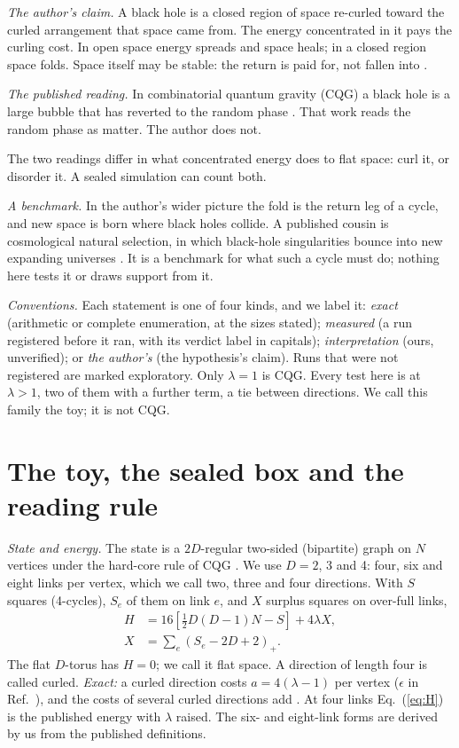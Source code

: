 \documentclass[aps,pre,10pt,twocolumn,superscriptaddress,nofootinbib]{revtex4-2}
\begin{document}
\emph{The author's claim.} A black hole is a closed region of space re-curled toward the curled arrangement that space
came from. The energy concentrated in it pays the curling cost. In open space energy spreads and space heals; in a
closed region space folds. Space itself may be stable: the return is paid for, not fallen into \cite{repo}.

\emph{The published reading.} In combinatorial quantum gravity (CQG) a black hole is a large bubble that has reverted
to the random phase \cite{T25}. That work reads the random phase as matter. The author does not.

The two readings differ in what concentrated energy does to flat space: curl it, or disorder it. A sealed simulation
can count both.

\emph{A benchmark.} In the author's wider picture the fold is the return leg of a cycle, and new space is born where
black holes collide. A published cousin is cosmological natural selection, in which black-hole singularities bounce
into new expanding universes \cite{Smolin06}. It is a benchmark for what such a cycle must do; nothing here tests it
or draws support from it.

\emph{Conventions.} Each statement is one of four kinds, and we label it: \emph{exact} (arithmetic or complete
enumeration, at the sizes stated); \emph{measured} (a run registered before it ran, with its verdict label in
capitals); \emph{interpretation} (ours, unverified); or \emph{the author's} (the hypothesis's claim). Runs that were
not registered are marked exploratory. Only $\lambda = 1$ is CQG. Every test here is at $\lambda > 1$, two of them
with a further term, a tie between directions. We call this family the toy; it is not CQG.

\section{The toy, the sealed box and the reading rule}\label{sec:toy}

\emph{State and energy.} The state is a $2D$-regular two-sided (bipartite) graph on $N$ vertices under the hard-core
rule of CQG \cite{T25}. We use $D = 2$, 3 and 4: four, six and eight links per vertex, which we call two, three and
four directions. With $S$ squares (4-cycles), $S_e$ of them on link $e$, and $X$ surplus squares on over-full links,
\begin{equation}
\begin{aligned}
  H &= 16\left[\tfrac{1}{2}D(D-1)N - S\right] + 4\lambda X ,\\
  X &= \textstyle\sum_e (S_e - 2D + 2)_+ .
\end{aligned}
\label{eq:H}
\end{equation}
The flat $D$-torus has $H = 0$; we call it flat space. A direction of length four is called curled. \emph{Exact:} a
curled direction costs $a = 4(\lambda - 1)$ per vertex ($\epsilon$ in Ref.~\cite{paper1}), and the costs of several
curled directions add \cite{paper5,repo}. At four links Eq.~(\ref{eq:H}) is the published energy with $\lambda$ raised. The
six- and eight-link forms are derived by us from the published definitions.
\end{document}

